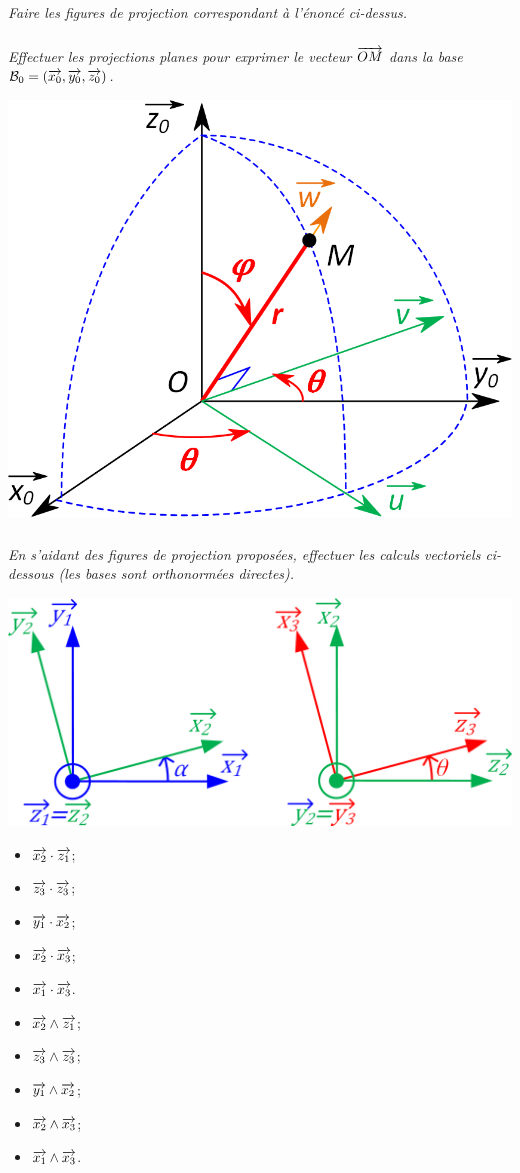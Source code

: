 \documentclass[10pt]{article}
\begin{document}
\subparagraph{}
\textit{Faire les figures de projection correspondant à l’énoncé ci-dessus.}

\subparagraph{}
\textit{Effectuer les projections planes pour exprimer le vecteur $\overrightarrow{OM}$ dans la base $\mathcal{B}_0=\left(\overrightarrow{x_0},\overrightarrow{y_0}, \overrightarrow{z_0}\right)$.}
\begin{center}
\includegraphics[width=.4\textwidth]{images/fig_02}
\end{center}

\subparagraph{}
\textit{En s’aidant des figures de projection proposées, effectuer les calculs vectoriels ci-dessous (les bases sont orthonormées directes).}

\begin{minipage}[c]{.47\linewidth}
\begin{center}
\includegraphics[width=.97\textwidth]{images/fig_03}
\end{center}
\end{minipage}\hfill
\begin{minipage}[c]{.47\linewidth}

\begin{multicols}{2}
\begin{itemize}
\item $\overrightarrow{x_2} \cdot \overrightarrow{z_1}$;
\item $\overrightarrow{z_3} \cdot \overrightarrow{z_3}$;
\item $\overrightarrow{y_1} \cdot \overrightarrow{x_2}$;
\item $\overrightarrow{x_2} \cdot \overrightarrow{x_3}$;
\item $\overrightarrow{x_1} \cdot \overrightarrow{x_3}$.
\end{itemize}

\begin{itemize}
\item $\overrightarrow{x_2} \wedge \overrightarrow{z_1}$;
\item $\overrightarrow{z_3} \wedge \overrightarrow{z_3}$;
\item $\overrightarrow{y_1} \wedge \overrightarrow{x_2}$;
\item $\overrightarrow{x_2} \wedge \overrightarrow{x_3}$;
\item $\overrightarrow{x_1} \wedge \overrightarrow{x_3}$.
\end{itemize}
\end{multicols}
\end{minipage}
\end{document}
